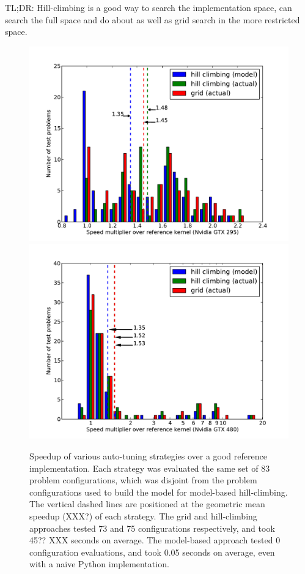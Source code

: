 \documentclass{sig-alternate}
\begin{document}
TL;DR: Hill-climbing is a good way to search the implementation space, can
search the full space and do about as well as grid search in the more
restricted space.

\begin{figure}
\centering
\includegraphics[scale=.42]{speedup_295.pdf}
\includegraphics[scale=.42]{speedup_480.pdf}
\caption{Speedup of various auto-tuning strategies over a good reference
implementation.
Each strategy was evaluated the same set of 83 problem configurations, which
was disjoint from the problem configurations used to build the model for
model-based hill-climbing.
The vertical dashed lines are positioned at the geometric mean speedup (XXX?)
of each strategy. The grid and hill-climbing approaches
tested 73 and 75 configurations respectively, and took 45?? XXX
seconds on average.
The model-based approach tested 0 configuration evaluations, and took 0.05
seconds on average, even with a naive Python implementation.
}
\label{fig:speedup}
\end{figure}
\end{document}
